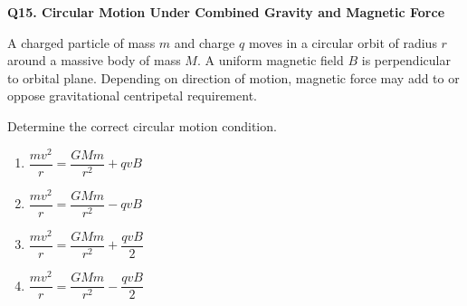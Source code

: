 \documentclass[12pt]{article}
\begin{document}
\textbf{Q15. Circular Motion Under Combined Gravity and Magnetic Force}


A charged particle of mass $m$ and charge $q$ moves in a circular orbit of radius $r$ around a massive body of mass $M$. A uniform magnetic field $B$ is perpendicular to orbital plane. Depending on direction of motion, magnetic force may add to or oppose gravitational centripetal requirement.

Determine the correct circular motion condition.

\begin{center}
\end{center}

\begin{enumerate}
\item[(A)] $\dfrac{mv^2}{r} = \dfrac{GMm}{r^2} + qvB$
\item[(B)] $\dfrac{mv^2}{r} = \dfrac{GMm}{r^2} - qvB$
\item[(C)] $\dfrac{mv^2}{r} = \dfrac{GMm}{r^2} + \dfrac{qvB}{2}$
\item[(D)] $\dfrac{mv^2}{r} = \dfrac{GMm}{r^2} - \dfrac{qvB}{2}$
\end{enumerate}
\end{document}
